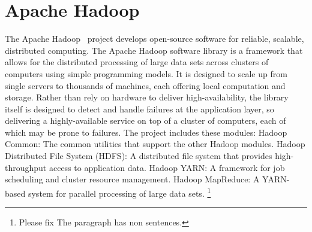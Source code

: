 \section{Apache Hadoop}

The Apache Hadoop~\cite{hid-sp18-515-www-hadoop} project develops
open-source software for reliable, scalable, distributed computing.
The Apache Hadoop software library is a framework that allows for the
distributed processing of large data sets across clusters of computers
using simple programming models. It is designed to scale up from
single servers to thousands of machines, each offering local
computation and storage. Rather than rely on hardware to deliver
high-availability, the library itself is designed to detect and handle
failures at the application layer, so delivering a highly-available
service on top of a cluster of computers, each of which may be prone
to failures.  The project includes these modules: Hadoop Common: The
common utilities that support the other Hadoop modules.  Hadoop
Distributed File System (HDFS): A distributed file system that
provides high-throughput access to application data.  Hadoop YARN: A
framework for job scheduling and cluster resource management.  Hadoop
MapReduce: A YARN-based system for parallel processing of large data
sets. \footnote{Please fix The paragraph has non sentences.}
